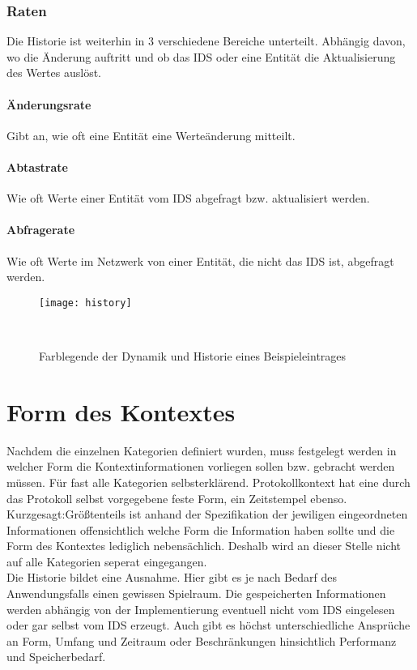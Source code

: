 \subsubsection{Raten}
Die Historie ist weiterhin in 3 verschiedene Bereiche unterteilt. Abhängig davon, wo die Änderung auftritt und ob das IDS oder eine Entität die Aktualisierung des Wertes auslöst.
\paragraph{Änderungsrate} 
Gibt an, wie oft eine Entität eine Werteänderung mitteilt.
\paragraph{Abtastrate}
Wie oft Werte einer Entität vom IDS abgefragt bzw. aktualisiert werden.
\paragraph{Abfragerate}
Wie oft Werte im Netzwerk von einer Entität, die nicht das IDS ist, abgefragt werden.
\begin{figure}[H]
\centering
\texttt{[image: history]}
\caption{Farblegende der Dynamik und Historie eines Beispieleintrages}
\
\end{figure}


\section{Form des Kontextes}
Nachdem die einzelnen Kategorien definiert wurden, muss festgelegt werden in welcher Form die Kontextinformationen vorliegen sollen bzw. gebracht werden müssen. Für fast alle Kategorien selbsterklärend. Protokollkontext hat eine durch das Protokoll selbst vorgegebene feste Form, ein Zeitstempel ebenso. Kurzgesagt:Größtenteils ist anhand der Spezifikation der jewiligen eingeordneten Informationen offensichtlich welche Form die Information haben sollte und die Form des Kontextes lediglich nebensächlich. Deshalb wird an dieser Stelle nicht auf alle Kategorien seperat eingegangen.\\
Die Historie bildet eine Ausnahme. Hier gibt es je nach Bedarf des Anwendungsfalls einen gewissen Spielraum. Die gespeicherten Informationen werden abhängig von der Implementierung eventuell nicht vom IDS eingelesen oder gar selbst vom IDS erzeugt. Auch gibt es höchst unterschiedliche Ansprüche an Form, Umfang und Zeitraum oder Beschränkungen hinsichtlich Performanz und Speicherbedarf.
